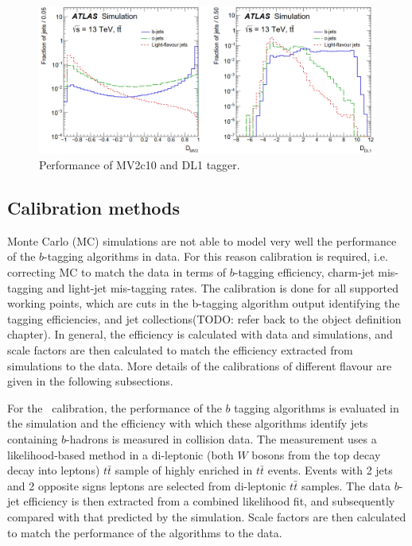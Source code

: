 \documentclass[letterpaper,12pt]{article}
\begin{document}
\begin{figure}
\includegraphics[width=1\textwidth]{MV2_DL1.png}
\caption{Performance of MV2c10 and DL1 tagger\cite{FTAG-2018-01}.}\label{fig:MV2_DL1}
\end{figure}

\subsection{Calibration methods}
Monte Carlo (MC) simulations are not able to model very well the 
performance of the $b$-tagging algorithms in data. For this reason 
calibration is required, i.e. correcting MC to match the data 
in terms of $b$-tagging efficiency, charm-jet mis-tagging and 
light-jet mis-tagging rates\cite{FTAG-2018-01}. The calibration is done 
for all supported working points, which are cuts in the b-tagging 
algorithm output identifying the tagging efficiencies, and jet 
collections(TODO: refer back to the object definition chapter). 
In general, the efficiency is calculated with data and simulations, 
and scale factors are then calculated to match the efficiency extracted 
from simulations to the data. More details of the calibrations of 
different flavour are given in the following subsections.


For the \bjet\ calibration, the performance of the $b$ tagging 
algorithms is evaluated in the simulation and the efficiency 
with which these algorithms identify jets containing $b$-hadrons 
is measured in collision data. The measurement uses a likelihood-based 
method in a di-leptonic (both $W$ bosons from the top decay decay 
into leptons) $t\bar{t}$ sample of highly enriched in $t\bar{t}$ 
events. Events with 2 jets and 2 opposite signs leptons are selected 
from di-leptonic $t\bar{t}$ samples. The data $b$-jet efficiency is 
then extracted from a combined likelihood fit, and subsequently 
compared with that predicted by the simulation. Scale factors are 
then calculated to match the performance of the algorithms to the data\cite{FTAG-2018-01}.
\end{document}
